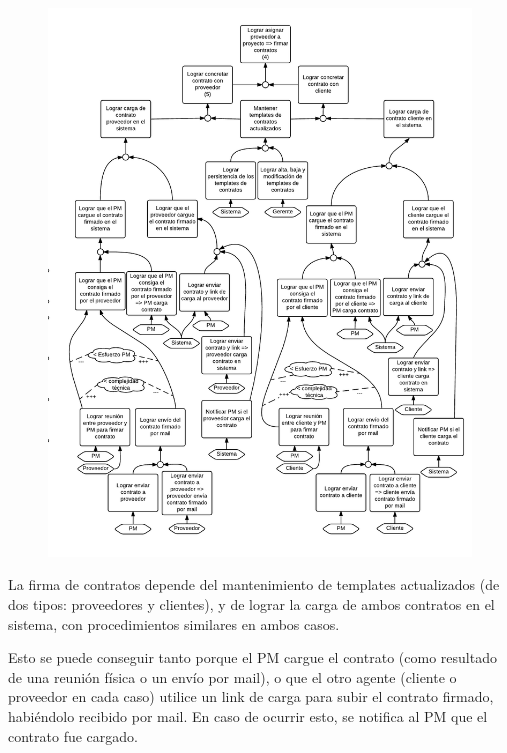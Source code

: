 \begin{figure}[H]
\includegraphics[width=\textwidth, clip=true, trim=15pt 30pt 12pt 20pt]{imagenes/objetivos/objetivos13.pdf}
\end{figure}

La firma de contratos depende del mantenimiento de templates actualizados (de dos tipos: proveedores y clientes), y de lograr la carga de ambos contratos en el sistema, con procedimientos similares en ambos casos.

Esto se puede conseguir tanto porque el PM cargue el contrato (como resultado de una reunión física o un envío por mail), o que el otro agente (cliente o proveedor en cada caso) utilice un link de carga para subir el contrato firmado, habiéndolo recibido por mail.
En caso de ocurrir esto, se notifica al PM que el contrato fue cargado.

\newpage
